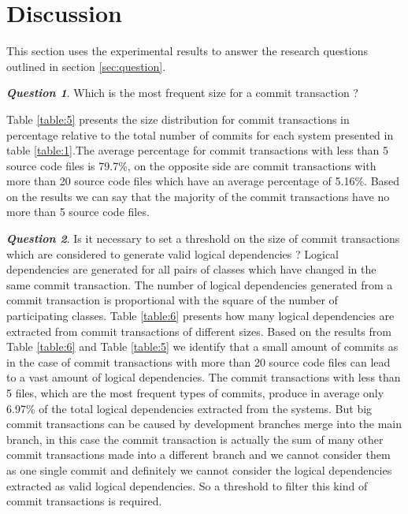 \documentclass[a4paper,twoside]{article}
\begin{document}
\section{Discussion}
\label{sec:discussion}


This section uses the experimental results to answer the research questions outlined in section \ref{sec:question}.


\textit{\textbf{Question 1}}. Which is the most frequent size for a commit transaction ?  

Table \ref{table:5} presents the size distribution for commit transactions in percentage relative to the total number of commits for each system presented in table \ref{table:1}.The average percentage for commit transactions with less than 5 source code files is 79.7\%, on the opposite side are commit transactions with more than 20 source code files which have an average percentage of 5.16\%. Based on the results we can say that the majority of the commit transactions have no more than 5 source code files.

\textit{\textbf{Question 2}}. Is it necessary to set a threshold on the size of commit transactions which are considered to generate valid logical dependencies ?
Logical dependencies are generated for all pairs of classes which have changed in the same commit transaction. The number of logical dependencies generated from a commit transaction is proportional with the square of the number of participating classes.  Table \ref{table:6} presents how many logical dependencies are extracted from commit transactions of different sizes. 
Based on the results from Table \ref{table:6} and Table \ref{table:5} we identify that a small amount of commits as in the case of commit transactions with more than 20 source code files can lead to a vast amount of logical dependencies.  
The commit transactions with less than 5 files, which are the most frequent types of commits, produce in average only 6.97\% of the total logical dependencies extracted from the systems. But big commit transactions can be caused by development branches merge into the main branch, in this case the commit transaction is actually the sum of many other commit transactions made into a different branch and we cannot consider them as one single commit and definitely we cannot consider the logical dependencies extracted as valid logical dependencies. So a threshold to filter this kind of commit transactions is required.
\end{document}
